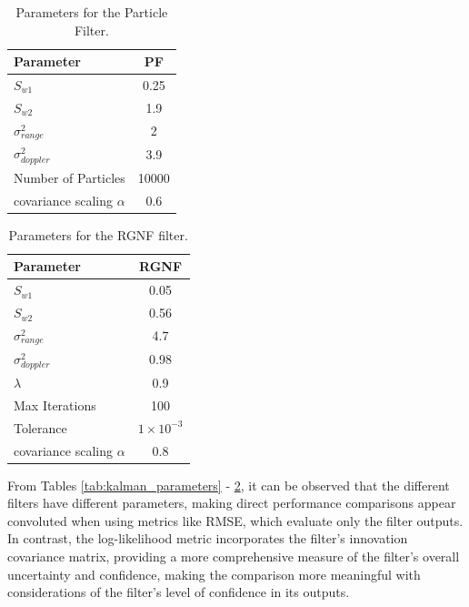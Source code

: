 \begin{table}[H]
    \centering
    \begin{tabular}{l c}
        \toprule
        \textbf{Parameter} & \textbf{PF} \\
        \midrule
        \(S_{w1}\) & 0.25 \\
        \(S_{w2}\) & 1.9 \\
        \(\sigma^2_{range}\) & 2 \\
        \(\sigma^2_{doppler}\) & 3.9 \\
        Number of Particles & 10000 \\
        covariance scaling \(\alpha\) & 0.6\\
        \bottomrule
    \end{tabular}
    \caption{Parameters for the Particle Filter.}
    \label{tab:particle_filter_parameters}
\end{table}

\begin{table}[H]
    \centering
    \begin{tabular}{l c}
        \toprule
        \textbf{Parameter} & \textbf{RGNF} \\
        \midrule
        \(S_{w1}\) & 0.05 \\
        \(S_{w2}\) & 0.56 \\
        \(\sigma^2_{range}\) & 4.7 \\
        \(\sigma^2_{doppler}\) & 0.98 \\
        \(\lambda\) & 0.9 \\
        Max Iterations & 100 \\
        Tolerance & \(1 \times 10^{-3}\) \\
        covariance scaling \(\alpha\) & 0.8\\
        \bottomrule
    \end{tabular}
    \caption{Parameters for the RGNF filter.}
    \label{tab:rgnf_parameters}
\end{table}

From Tables \ref{tab:kalman_parameters} - \ref{tab:rgnf_parameters}, it can be observed that the different filters have different parameters, making direct performance comparisons appear convoluted when using metrics like \ac{RMSE}, which evaluate only the filter outputs. In contrast, the log-likelihood metric incorporates the filter's innovation covariance matrix, providing a more comprehensive measure of the filter’s overall uncertainty and confidence, making the comparison more meaningful with considerations of the filter's level of confidence in its outputs.  
\newline

